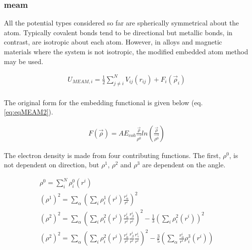 \subsubsection{\Acrlong{meam}}
\label{section:meam}

All the potential types considered so far are spherically symmetrical about the atom.  Typically covalent bonds tend to be directional but metallic bonds, in contrast, are isotropic about each atom.  However, in alloys and magnetic materials where the system is not isotropic, the modified embedded atom method may be used.

\begin{equation}
\begin{split}
U_{MEAM, i} = \frac{1}{2} \sum \limits_{j\ne i}^{N} V_{ij}(r_{ij}) + F_i (\vec{\rho}_i) \\
\end{split}
\label{eq:eqMEAM1}
\end{equation}

The original form for the embedding functional is given below (eq. \ref{eq:eqMEAM2})\cite{semiempiricalpots}.

\begin{equation}
\begin{split}
F(\vec{\rho}) = A E_{coh} \frac{\vec{\rho}}{\vec{\rho^0}} ln \left(\frac{\vec{\rho}}{\vec{\rho^0}}\right)
\end{split}
\label{eq:eqMEAM2}
\end{equation}

The electron density is made from four contributing functions.  The first, $\rho^0$, is not dependent on direction, but $\rho^1$, $\rho^2$ and $\rho^3$ are dependent on the angle.

\begin{equation}
\begin{split}
\rho^0 = \sum_i^N \rho_i^0 (r^i) \\
(\rho^1)^2 = \sum_\alpha \left( \sum_i \rho_i^1 (r^i) \frac{r^i_{\alpha}}{r^i} \right)^2 \\
(\rho^2)^2 = \sum_\alpha \left( \sum_i \rho_i^2 (r^i) \frac{r^i_{\alpha}}{r^i}  \frac{r^i_{\beta}}{r^i} \right)^2 - \frac{1}{3} \left(\sum_i \rho_i^2 (r^i) \right)^2 \\
(\rho^2)^2 = \sum_\alpha \left( \sum_i \rho_i^2 (r^i) \frac{r^i_{\alpha}}{r^i}  \frac{r^i_{\beta}}{r^i} \frac{r^i_{\gamma}}{r^i} \right)^2 - \frac{3}{5} \left(\sum_{\alpha} \frac{r^i_{\alpha}}{r^i} \rho_i^3 (r^i) \right) \\
\end{split}
\label{eq:eqMEAM3}
\end{equation}

